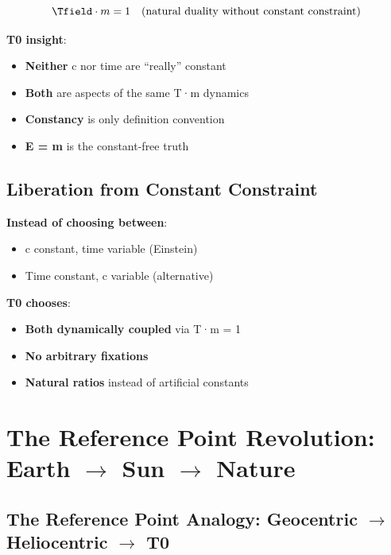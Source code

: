 	\begin{equation}
		\Tfield \cdot m = 1 \quad \text{(natural duality without constant constraint)}
	\end{equation}
	
	\textbf{T0 insight}:
	\begin{itemize}
		\item \textbf{Neither} c nor time are ``really'' constant
		\item \textbf{Both} are aspects of the same T·m dynamics
		\item \textbf{Constancy} is only definition convention
		\item \textbf{E = m} is the constant-free truth
	\end{itemize}
	
	\subsection{Liberation from Constant Constraint}
	
	\textbf{Instead of choosing between}:
	\begin{itemize}
		\item c constant, time variable (Einstein)
		\item Time constant, c variable (alternative)
	\end{itemize}
	
	\textbf{T0 chooses}:
	\begin{itemize}
		\item \textbf{Both dynamically coupled} via T·m = 1
		\item \textbf{No arbitrary fixations}
		\item \textbf{Natural ratios} instead of artificial constants
	\end{itemize}
	
	\section{The Reference Point Revolution: Earth $\rightarrow$ Sun $\rightarrow$ Nature}
	
	\subsection{The Reference Point Analogy: Geocentric $\rightarrow$ Heliocentric $\rightarrow$ T0}
	
